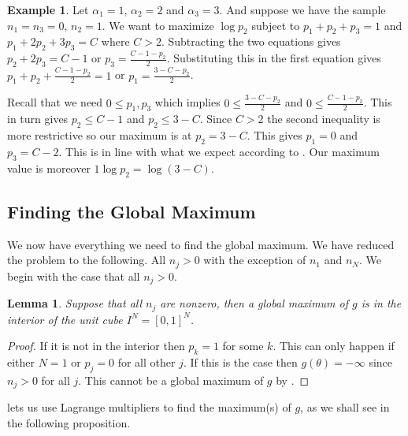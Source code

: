 \documentclass{article}
\theoremstyle{plain}
\newtheorem{lemma}       {\bf Lemma}       [section]
\theoremstyle{definition}
\newtheorem{example}     {\bf Example}     [section]
\begin{document}
\begin{example}\label{simpleexample}
	Let $\alpha_1=1$, $\alpha_2=2$ and $\alpha_3=3$. And suppose we have the sample
	$n_1=n_3=0$, $n_2=1$. We want to maximize $\log p_2$ subject to $p_1+p_2+p_3=1$
	and $p_1+2p_2+3p_3=C$ where $C>2$.
	Subtracting the two equations gives $p_2+2p_3=C-1$ or $p_3=\frac{C-1-p_2}{2}$.
	Substituting this in the first equation gives $p_1+p_2+\frac{C-1-p_2}{2}=1$ or
	$p_1=\frac{3-C-p_2}{2}$.

	Recall that we need $0\leq p_1,p_3$ which implies
	$0\leq\frac{3-C-p_2}{2}$ and $0\leq\frac{C-1-p_2}{2}$. This in turn gives
	$p_2\leq C-1$
	and $p_2\leq 3-C$. Since $C>2$ the second inequality is more restrictive so our
	maximum is at $p_2=3-C$.
	This gives $p_1=0$ and $p_3=C-2$. This is in line with what we expect according to
	. Our maximum value is moreover $1\log p_2=\log(3-C)$.
\end{example}

\subsection{Finding the Global Maximum}
We now have everything we need to find the global maximum. We have reduced the problem
to the following. All $n_j>0$ with the exception of $n_1$ and $n_N$. We begin with the
case that all $n_j>0$.

\begin{lemma}\label{interior}
	Suppose that all $n_j$ are nonzero, then a global maximum of $g$ is in the
	interior of the unit cube $I^N=[0,1]^N$.
\end{lemma}
\begin{proof}
	If it is not in the interior then $p_k=1$ for some $k$. This can only happen
	if either $N=1$ or $p_j=0$ for all other $j$. If this is the
	case then $g(\theta)=-\infty$ since $n_j>0$ for all $j$. This cannot be
	a global maximum of $g$ by .
\end{proof}

 lets us use Lagrange multipliers to find the maximum(s) of $g$, as we
shall see in the following proposition.
\end{document}
